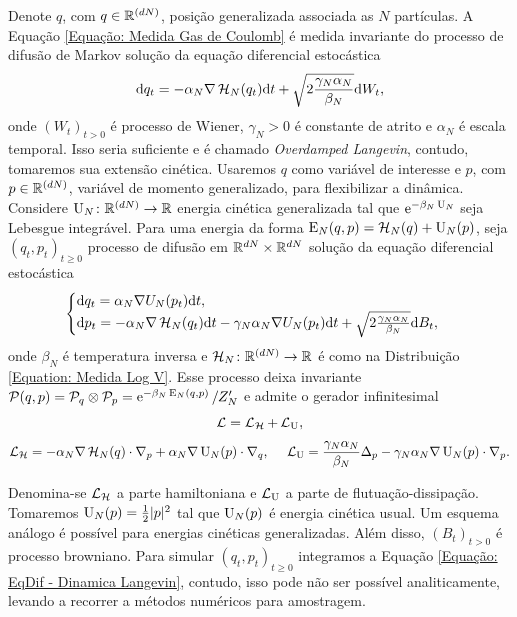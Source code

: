 \documentclass[12pt]{report}
\begin{document}
Denote $q$, com $q \in \mathbb{R}^{(dN)}$, posição generalizada associada as $N$ partículas. A Equação \eqref{Equação: Medida Gas de Coulomb} é medida invariante do processo de difusão de Markov solução da equação diferencial estocástica
\begin{equation}
	\mathrm{d} q_t = -\alpha_N \nabla \operatorname{\mathcal{H}}_N(q_t) \mathrm{d} t + \sqrt{2\frac{\gamma_N \alpha_N}{\beta_N}} \mathrm{d} W_t,
	\label{Equação: Langevin Overdamped}
\end{equation}
onde $(W_t)_{t>0}$ é processo de Wiener, $\gamma_N > 0$ é constante de atrito e $\alpha_N$ é escala temporal. Isso seria suficiente e é chamado \textit{Overdamped Langevin}, contudo, tomaremos sua extensão cinética. Usaremos $q$ como variável de interesse e $p$, com $p \in \mathbb{R}^{(dN)}$, variável de momento generalizado, para flexibilizar a dinâmica. Considere $\operatorname{U}_N \colon \mathbb{R}^{(dN)} \rightarrow \mathbb{R}$ energia cinética generalizada tal que $\operatorname{\rm e}^{-\beta_N \operatorname{U}_N}$ seja Lebesgue integrável. Para uma energia da forma $\operatorname{E}_N(q,p) = \operatorname{\mathcal{H}}_N(q) + \operatorname{U}_N(p)$, seja $(q_t, p_t)_{t\geq0}$ processo de difusão em $\mathbb{R}^{dN} \times \mathbb{R}^{dN}$ solução da equação diferencial estocástica
\begin{equation}
	\begin{cases}
		\mathrm{d} q_t = \alpha_N \nabla U_N (p_t) \mathrm{d} t, \\
		\mathrm{d} p_t = -\alpha_N \nabla \operatorname{\mathcal{H}}_N(q_t) \mathrm{d} t - \gamma_N \alpha_N \nabla U_N(p_t) \mathrm{d} t + \sqrt{2\frac{\gamma_N \alpha_N}{\beta_N}} \mathrm{d} B_t,
	\end{cases}
	\label{Equação: EqDif - Dinamica Langevin}
\end{equation}
onde $\beta_N$ é temperatura inversa e $\operatorname{\mathcal{H}}_N \colon \mathbb{R}^{(dN)} \rightarrow \mathbb{R}$ é como na Distribuição \eqref{Equation: Medida Log V}. \cite{Stoltz2018} Esse processo deixa invariante $\mathcal{P}(q,p) = \mathcal{P}_q \otimes \mathcal{P}_p = \operatorname{\rm e}^{-\beta_N \operatorname{E}_N(q,p)}/Z'_N$ e admite o gerador infinitesimal 
\[
\operatorname{\mathcal{L}} = \operatorname{\mathcal{L}}_{\operatorname{\mathcal{H}}} + \operatorname{\mathcal{L}}_{\operatorname{U}},
\]
\[
\operatorname{\mathcal{L}}_{\operatorname{\mathcal{H}}} = -\alpha_N \nabla\operatorname{\mathcal{H}}_N(q) \cdot \nabla_p + \alpha_N \nabla \operatorname{U}_N(p) \cdot \nabla_q, \ \ \ \ \operatorname{\mathcal{L}}_{\operatorname{U}} = \frac{\gamma_N\alpha_N}{\beta_N} \Delta_p - \gamma_N \alpha_N \nabla \operatorname{U}_N(p) \cdot \nabla_p.
\]

Denomina-se $\operatorname{\mathcal{L}}_{\operatorname{\mathcal{H}}}$ a parte hamiltoniana e $\operatorname{\mathcal{L}}_{\operatorname{U}}$ a parte de flutuação-dissipação. Tomaremos $\operatorname{U}_N(p) = \frac{1}{2} |p|^2$ tal que $\operatorname{U}_N(p)$ é energia cinética usual. Um esquema análogo é possível para energias cinéticas generalizadas. \cite{Stoltz2018} Além disso, $(B_t)_{t>0}$ é processo browniano. Para simular $(q_t,p_t)_{t \geq 0}$ integramos a Equação \eqref{Equação: EqDif - Dinamica Langevin}, contudo, isso pode não ser possível analiticamente, levando a recorrer a métodos numéricos para amostragem.
\end{document}
